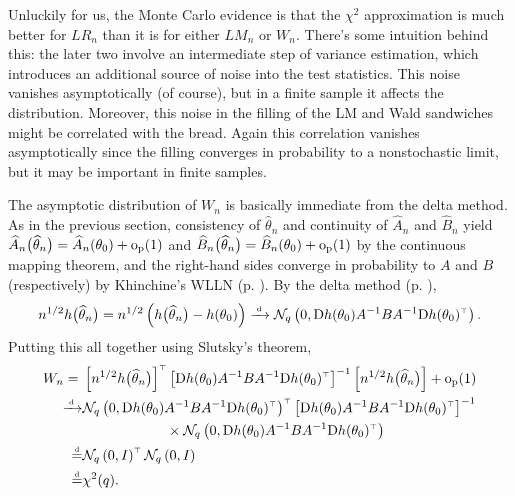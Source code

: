 \documentclass[11pt,letterpaper,reqno,oneside]{article}
\begin{document}
Unluckily for us, the Monte Carlo evidence is that the $\chi^2$ approximation is much better for $\mathit{LR}_n$ than it is for either $\textit{LM}_n$ or $W_n$. There's some intuition behind this: the later two involve an intermediate step of variance estimation, which introduces an additional source of noise into the test statistics. This noise vanishes asymptotically (of course), but in a finite sample it affects the distribution. Moreover, this noise in the filling of the LM and Wald sandwiches might be correlated with the bread. Again this correlation vanishes asymptotically since the filling converges in probability to a nonstochastic limit, but it may be important in finite samples.


The asymptotic distribution of $W_n$ is basically immediate from the delta method. As in the previous section, consistency of $\widehat{\theta}_n$ and continuity of $\widehat{A}_n$ and $\widehat{B}_n$ yield $\widehat{A}_n\bigl( \widehat{\theta}_n \bigr) = \widehat{A}_n(\theta_0) + \mathrm{o}_{\mathrm{p}}(1)$ and $\widehat{B}_n\bigl( \widehat{\theta}_n \bigr) = \widehat{B}_n(\theta_0) + \mathrm{o}_{\mathrm{p}}(1)$ by the continuous mapping theorem, and the right-hand sides converge in probability to $A$ and $B$ (respectively) by Khinchine's WLLN (p. \pageref{corollary:Khinchine_WLLN}). By the delta method (p. \pageref{proposition:delta_method}),
%
\begin{equation*}
	n^{1/2} h\bigl( \widehat{\theta}_n \bigr)
	= n^{1/2} \left( h\bigl( \widehat{\theta}_n \bigr) - h(\theta_0) \right)
	\xrightarrow{{\scriptscriptstyle \mathrm{\;d\;}}} \mathcal{N}_q\left( 0, \mathrm{D} h(\theta_0) 
	A^{-1} B A^{-1} 
	\mathrm{D} h(\theta_0)^{\scriptscriptstyle \top} \right) .
\end{equation*}
%
Putting this all together using Slutsky's theorem,
%
\begin{align*}
	W_n
	={}&
	\left[ n^{1/2} h\bigl( \widehat{\theta}_n \bigr) \right]^{\scriptscriptstyle \top}
	\left[ \mathrm{D} h(\theta_0)
	A^{-1} B A^{-1}
	\mathrm{D} h(\theta_0)^{\scriptscriptstyle \top} \right]^{-1}
	\left[ n^{1/2} h\bigl( \widehat{\theta}_n \bigr) \right]
	+ \mathrm{o}_{\mathrm{p}}(1)
	\\
	\xrightarrow{{\scriptscriptstyle \mathrm{\;d\;}}}&
	\mathcal{N}_q\left( 0, \mathrm{D} h(\theta_0) 
	A^{-1} B A^{-1} 
	\mathrm{D} h(\theta_0)^{\scriptscriptstyle \top} \right)^{\scriptscriptstyle \top}
	\left[ \mathrm{D} h(\theta_0)
	A^{-1} B A^{-1}
	\mathrm{D} h(\theta_0)^{\scriptscriptstyle \top} \right]^{-1}
	\\
	&\quad\quad\quad\quad\quad\quad\times
	\mathcal{N}_q\left( 0, \mathrm{D} h(\theta_0) 
	A^{-1} B A^{-1} 
	\mathrm{D} h(\theta_0)^{\scriptscriptstyle \top} \right)
	\\
	\protect\overset{{\scriptscriptstyle \mathrm{d}}}{=}&
	\mathcal{N}_q\left( 0, I \right)^{\scriptscriptstyle \top}
	\mathcal{N}_q\left( 0, I \right)
	\\
	\protect\overset{{\scriptscriptstyle \mathrm{d}}}{=}&
	\chi^2(q) .
\end{align*}
\end{document}
